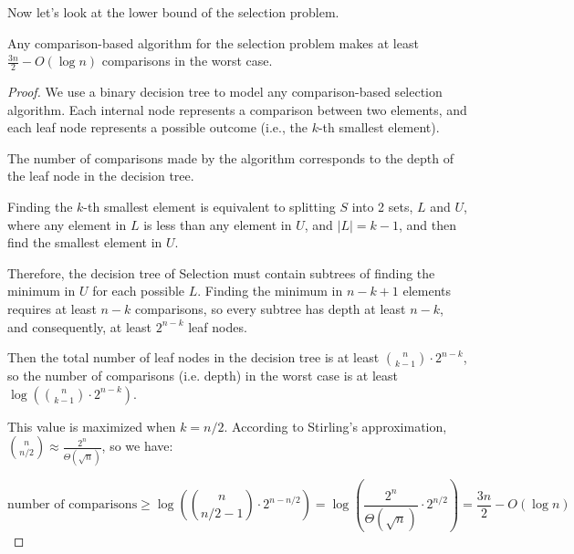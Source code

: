 Now let's look at the lower bound of the selection problem.
\begin{theorem}
  Any comparison-based algorithm for the selection problem makes at least $\frac{3n}{2}-O(\log n)$ comparisons in the worst case.
\end{theorem}
\begin{proof}
  We use a binary decision tree to model any comparison-based selection algorithm. Each internal node represents a comparison between two elements, and each leaf node represents a possible outcome (i.e., the $k$-th smallest element).


The number of comparisons made by the algorithm corresponds to the depth of the leaf node in the decision tree.

Finding the $k$-th smallest element is equivalent to splitting $S$ into 2 sets, $L$ and $U$, where any element in $L$ is less than any element in $U$, and $|L| = k-1$, and then find the smallest element in $U$.

Therefore, the decision tree of Selection must contain subtrees of finding the minimum in $U$ for each possible $L$. Finding the minimum in $n-k+1$ elements requires at least $n-k$ comparisons, so every subtree has depth at least $n-k$, and consequently, at least $2^{n-k}$ leaf nodes.

Then the total number of leaf nodes in the decision tree is at least $\binom{n}{k-1} \cdot 2^{n-k}$, so the number of comparisons (i.e. depth) in the worst case is at least $\log \left( \binom{n}{k-1} \cdot 2^{n-k} \right)$.

This value is maximized when $k = n/2$. According to Stirling's approximation, $\binom{n}{n/2} \approx \frac{2^n}{\Theta(\sqrt{n})}$, so we have:

\[
  \text{number of comparisons} \geq \log \left( \binom{n}{n/2 - 1} \cdot 2^{n - n/2} \right) = \log \left( \frac{2^n}{\Theta(\sqrt{n})} \cdot 2^{n/2} \right) = \frac{3n}{2} - O(\log n)
\]

\end{proof}


